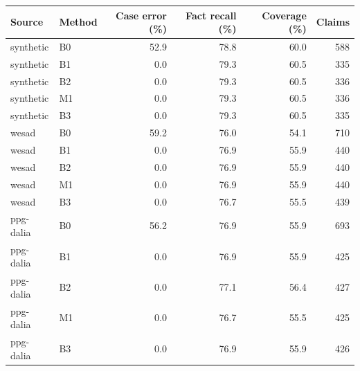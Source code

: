 \begin{tabular}{llrrrr}
\toprule
Source & Method & Case error (\%) & Fact recall (\%) & Coverage (\%) & Claims \\
\midrule
synthetic & B0 & 52.9 & 78.8 & 60.0 & 588 \\
synthetic & B1 & 0.0 & 79.3 & 60.5 & 335 \\
synthetic & B2 & 0.0 & 79.3 & 60.5 & 336 \\
synthetic & M1 & 0.0 & 79.3 & 60.5 & 336 \\
synthetic & B3 & 0.0 & 79.3 & 60.5 & 335 \\
wesad & B0 & 59.2 & 76.0 & 54.1 & 710 \\
wesad & B1 & 0.0 & 76.9 & 55.9 & 440 \\
wesad & B2 & 0.0 & 76.9 & 55.9 & 440 \\
wesad & M1 & 0.0 & 76.9 & 55.9 & 440 \\
wesad & B3 & 0.0 & 76.7 & 55.5 & 439 \\
ppg-dalia & B0 & 56.2 & 76.9 & 55.9 & 693 \\
ppg-dalia & B1 & 0.0 & 76.9 & 55.9 & 425 \\
ppg-dalia & B2 & 0.0 & 77.1 & 56.4 & 427 \\
ppg-dalia & M1 & 0.0 & 76.7 & 55.5 & 425 \\
ppg-dalia & B3 & 0.0 & 76.9 & 55.9 & 426 \\
\bottomrule
\end{tabular}
